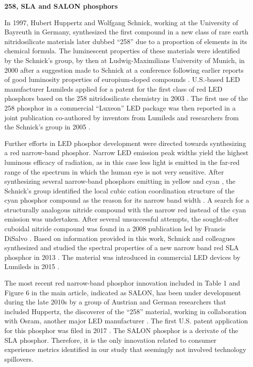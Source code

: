 \documentclass[parskip=full]{article}
\begin{document}
\textbf{258, SLA and SALON phosphors}

In 1997, Hubert Huppertz and Wolfgang Schnick, working at the University of Bayreuth in Germany, synthesized the first compound in a new class of rare earth nitridosilicate materials \cite{Huppertz1997} later dubbed “258” due to a proportion of elements in its chemical formula. The luminescent properties of these materials were identified by the Schnick’s group, by then at Ludwig-Maximilians University of Munich, in 2000 \cite{Hppe2000} after a suggestion made to Schnick at a conference following earlier reports of good luminosity properties of europium-doped compounds \cite{Qiua1998}. U.S.-based LED manufacturer Lumileds applied for a patent for the first class of red LED phosphors based on the 258 nitridosilicate chemistry in 2003 \cite{mueller2004phosphor}. The first use of the 258 phosphor in a commercial “Luxeon” LED package was then reported in a joint publication co-authored by inventors from Lumileds and researchers from the Schnick’s group in 2005 \cite{MuellerMach2005}.

Further efforts in LED phosphor development were directed towards synthesizing a red narrow-band phosphor. Narrow LED emission peak widths yield the highest luminous efficacy of radiation, as in this case less light is emitted in the far-red range of the spectrum in which the human eye is not very sensitive. After synthesizing several narrow-band phosphors emitting in yellow \cite{Hppe2004} and cyan \cite{Kechele2009}, the Schnick’s group identified the local cubic cation coordination structure of the cyan phosphor compound as the reason for its narrow band width \cite{lumi2016narrow}. A search for a structurally analogous nitride compound with the narrow red instead of the cyan emission was undertaken. After several unsuccessful attempts, the sought-after cuboidal nitride compound was found in a 2008 publication led by Francis DiSalvo \cite{Park2008Sr}. Based on information provided in this work, Schnick and colleagues synthesized and studied the spectral properties of a new narrow band red SLA phosphor in 2013 \cite{schmidt2013new}\cite{Pust2014}\cite{schmidt2017phosphors}. The material was introduced in commercial LED devices by Lumileds in 2015 \cite{lumi2016narrow_whitepaper}. 

The most recent red narrow-band phosphor innovation included in Table 1 and Figure 6 in the main article, indicated as SALON, has been under development during the late 2010s by a group of Austrian and German researchers that included Huppertz, the discoverer of the “258” material, working in collaboration with Osram, another major LED manufacturer \cite{seibald2019phosphor}\cite{Hoerder2019}\cite{Hoerder2020}. The first U.S. patent application for this phosphor was filed in 2017 \cite{seibald2019phosphor}. The SALON phosphor is a derivate of the SLA phosphor. Therefore, it is the only innovation related to consumer experience metrics identified in our study that seemingly not involved technology spillovers.
\end{document}
